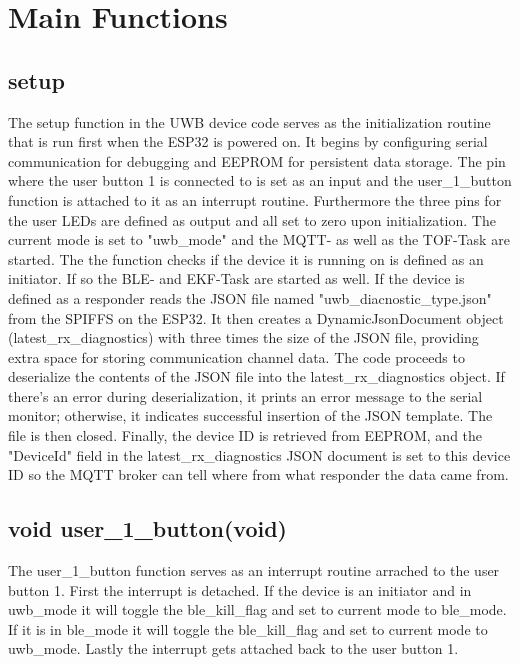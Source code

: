 \section{Main Functions}
\label{sec:Main_Functions}

\subsection{setup}
\label{subsec:setup}
The setup function in the UWB device code serves as the initialization routine that is run first when the ESP32 is powered on. 
It begins by configuring serial communication for debugging and EEPROM for persistent data storage. 
The pin where the user button 1 is connected to is set as an input and the user\_1\_button function is attached to it as an interrupt routine. 
Furthermore the three pins for the user LEDs are defined as output and all set to zero upon initialization. 
The current mode is set to "uwb\_mode" and the MQTT- as well as the TOF-Task are started. 
\vspace{4pt}
\newline
The the function checks if the device it is running on is defined as an initiator. 
If so the BLE- and EKF-Task are started as well. 
\vspace{4pt}
\newline
If the device is defined as a responder reads the JSON file named "uwb\_diacnostic\_type.json" from the SPIFFS on the ESP32.
It then creates a DynamicJsonDocument object (latest\_rx\_diagnostics) with three times the size of the JSON file, providing extra space for storing communication channel data.
The code proceeds to deserialize the contents of the JSON file into the latest\_rx\_diagnostics object. If there's an error during deserialization, it prints an error message to the serial monitor; otherwise, it indicates successful insertion of the JSON template. The file is then closed. Finally, the device ID is retrieved from EEPROM, and the "DeviceId" field in the latest\_rx\_diagnostics JSON document is set to this device ID so the MQTT broker can tell where from what responder the data came from. 

\subsection{void user\_1\_button(void)}
\label{subsec:user_1_button}
The user\_1\_button function serves as an interrupt routine arrached to the user button 1. 
First the interrupt is detached. 
If the device is an initiator and in uwb\_mode it will toggle the ble\_kill\_flag and set to current mode to ble\_mode. 
If it is in ble\_mode it will toggle the ble\_kill\_flag and set to current mode to uwb\_mode. 
Lastly the interrupt gets attached back to the user button 1. 


